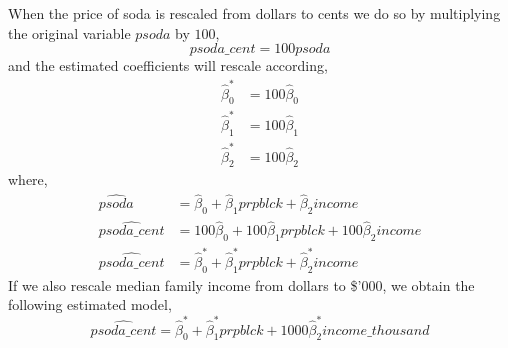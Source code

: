 \documentclass[12pt]{report}
\begin{document}
\justify
\noindent When the price of soda is rescaled from dollars to cents we do so by multiplying the original variable $psoda$ by $100$,
$$psoda\_cent = 100psoda$$
and the estimated coefficients will rescale according,
\begin{align*}
\hat{\beta}_{0}^{*} &= 100\hat{\beta}_{0} \\
\hat{\beta}_{1}^{*} &= 100\hat{\beta}_{1} \\
\hat{\beta}_{2}^{*} &= 100\hat{\beta}_{2}
\end{align*}
\noindent where,
\begin{align*}
\widehat{psoda} &= \hat{\beta}_0 + \hat{\beta}_1prpblck + \hat{\beta}_2income \\
\widehat{psoda\_cent} &= 100\hat{\beta}_0 + 100\hat{\beta}_1prpblck + 100\hat{\beta}_2income \\
\widehat{psoda\_cent} &= \hat{\beta}_{0}^{*} + \hat{\beta}_{1}^{*}prpblck + \hat{\beta}_{2}^{*}income
\end{align*}
\noindent If we also rescale median family income from dollars to \$'000, we obtain the following estimated model, $$\widehat{psoda\_cent} = \hat{\beta}_{0}^{*} + \hat{\beta}_{1}^{*}prpblck + 1000\hat{\beta}_{2}^{*}income\_thousand$$
\end{document}

